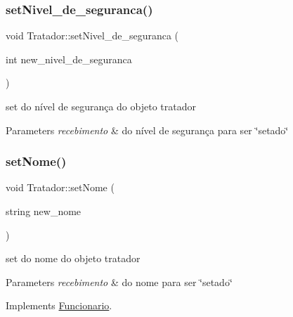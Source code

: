 \mbox{\label{class_tratador_a21f76262c8abf9c4e4a73b8a19a4527c}} 
\subsubsection{\texorpdfstring{setNivel\_de\_seguranca()}{setNivel\_de\_seguranca()}}
{\footnotesize\ttfamily void Tratador\+::set\+Nivel\+\_\+de\+\_\+seguranca (\begin{DoxyParamCaption}\item[{int}]{new\+\_\+nivel\+\_\+de\+\_\+seguranca }\end{DoxyParamCaption})}



set do nível de segurança do objeto tratador 


\begin{DoxyParams}{Parameters}
{\em recebimento} & do nível de segurança para ser \char`\"{}setado\char`\"{} \\
\hline
\end{DoxyParams}
\mbox{\label{class_tratador_a85649388e0905b1f041dcdd74f90a9cf}} 
\subsubsection{\texorpdfstring{setNome()}{setNome()}}
{\footnotesize\ttfamily void Tratador\+::set\+Nome (\begin{DoxyParamCaption}\item[{string}]{new\+\_\+nome }\end{DoxyParamCaption})\hspace{0.3cm}{\ttfamily [virtual]}}



set do nome do objeto tratador 


\begin{DoxyParams}{Parameters}
{\em recebimento} & do nome para ser \char`\"{}setado\char`\"{} \\
\hline
\end{DoxyParams}


Implements \mbox{\hyperlink{class_funcionario}{Funcionario}}.

\mbox{\label{class_tratador_a1140410a347421770421fe57e95f814a}} 
